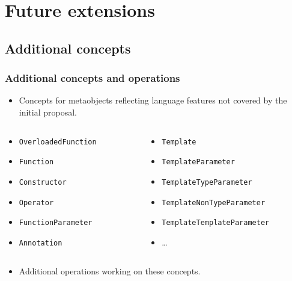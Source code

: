 \documentclass[compress,table,xcolor=table]{beamer}
\begin{document}
\section{Future extensions}

\subsection{Additional concepts}
\begin{frame}
\frametitle{Additional concepts and operations}
  \begin{itemize}
    \small
    \item Concepts for metaobjects reflecting language features not covered
    by the initial proposal.
  \end{itemize}
  \begin{columns}
    \scriptsize
    \begin{column}{0.35\textwidth}
      \begin{itemize}
      \item \texttt{OverloadedFunction}
      \item \texttt{Function}
      \item \texttt{Constructor}
      \item \texttt{Operator}
      \item \texttt{FunctionParameter}
      \item \texttt{Annotation}
      \end{itemize}
    \end{column}
    \begin{column}{0.40\textwidth}
      \begin{itemize}
      \item \texttt{Template}
      \item \texttt{TemplateParameter}
      \item \texttt{TemplateTypeParameter}
      \item \texttt{TemplateNonTypeParameter}
      \item \texttt{TemplateTemplateParameter}
      \item \ldots
      \end{itemize}
    \end{column}
  \end{columns}
  \begin{itemize}
    \small
    \item Additional operations working on these concepts.
  \end{itemize}
  \begin{columns}

\end{columns}
\end{frame}
\end{document}
